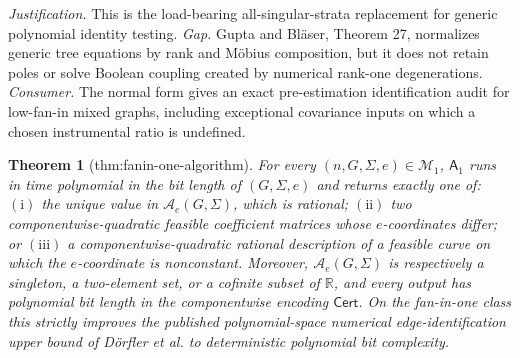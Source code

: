 \documentclass{article}
\newtheorem{theorem}{Theorem}
\begin{document}
\par\smallskip\noindent \textit{Justification.} This is the load-bearing all-singular-strata replacement for generic polynomial identity testing. \textit{Gap.} Gupta and Bläser, Theorem 27, normalizes generic tree equations by rank and Möbius composition, but it does not retain poles or solve Boolean coupling created by numerical rank-one degenerations. \textit{Consumer.} The normal form gives an exact pre-estimation identification audit for low-fan-in mixed graphs, including exceptional covariance inputs on which a chosen instrumental ratio is undefined.

\begin{theorem}[thm:fanin-one-algorithm]\label{thm:fanin-one-algorithm}
For every \((n,G,\Sigma,e)\in\mathcal M_1\), \(\mathsf A_1\) runs in time polynomial in the bit length of \((G,\Sigma,e)\) and returns exactly one of: \(\mathrm{(i)}\) the unique value in \(\mathcal A_e(G,\Sigma)\), which is rational; \(\mathrm{(ii)}\) two componentwise-quadratic feasible coefficient matrices whose \(e\)-coordinates differ; or \(\mathrm{(iii)}\) a componentwise-quadratic rational description of a feasible curve on which the \(e\)-coordinate is nonconstant. Moreover, \(\mathcal A_e(G,\Sigma)\) is respectively a singleton, a two-element set, or a cofinite subset of \(\mathbb R\), and every output has polynomial bit length in the componentwise encoding \(\mathsf{Cert}\). On the fan-in-one class this strictly improves the published polynomial-space numerical edge-identification upper bound of Dörfler et al. to deterministic polynomial bit complexity.
\end{theorem}
\end{document}
